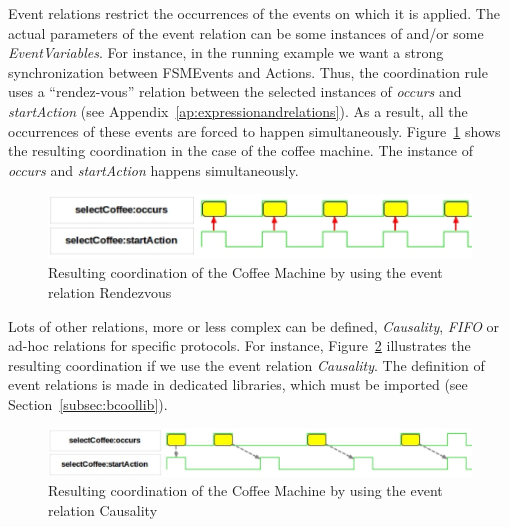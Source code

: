 Event relations restrict the occurrences of the events on which it is applied. The actual parameters of the event relation can be some instances of \dse and/or some \emph{EventVariables}. For instance, in the running example we want a strong synchronization between FSMEvents and Actions. Thus, the coordination rule uses a ``rendez-vous'' relation between the selected instances of \dse \emph{occurs} and \emph{startAction} (see Appendix~\ref{ap:expressionandrelations}). As a result, all the occurrences of these events are forced to happen simultaneously. Figure~\ref{fig:runningrdv} shows the resulting coordination in the case of the coffee machine. The instance of \dse \emph{occurs} and \emph{startAction} happens simultaneously.

\begin{figure}[h]
	\center
	\includegraphics[width=.6\textwidth]{bcool/figs/runningrdv}
	\caption{Resulting coordination of the Coffee Machine by using the event relation Rendezvous}
	\label{fig:runningrdv}
\end{figure}
	

Lots of other relations, more or less complex can be defined, \eg \emph{Causality}, \emph{FIFO} or ad-hoc relations for specific protocols. For instance, Figure~\ref{fig:runningrunningcausality} illustrates the resulting coordination if we use the event relation \emph{Causality}. The definition of event relations is made in dedicated libraries, which must be imported (see Section~\ref{subsec:bcoollib}).

\begin{figure}[h]
	\center
	\includegraphics[width=.65\textwidth]{bcool/figs/runningcausality}
	\caption{Resulting coordination of the Coffee Machine by using the event relation Causality}
	\label{fig:runningrunningcausality}
\end{figure}